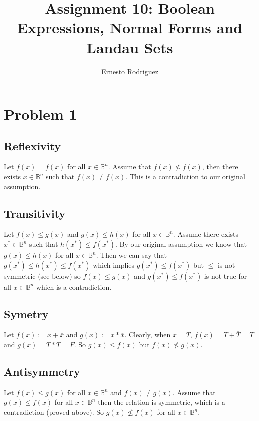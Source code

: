 \documentclass[11pt]{article}
\author{Ernesto Rodriguez}
\title{Assignment 10: Boolean Expressions, Normal Forms and Landau Sets}
\begin{document}
\maketitle

\section{Problem 1}

\subsection{Reflexivity}

Let $f(x)=f(x)$ for all $x \in \mathbb{B}^n$. Assume that $f(x) \nleq f(x)$, then there exists $x \in \mathbb{B}^n$ such that $f(x)\neq f(x)$. This is a contradiction to our original assumption.

\subsection{Transitivity}

Let $f(x)\leq g(x)$ and $g(x)\leq h(x)$ for all $x\in \mathbb{B}^n$. Assume there exists $x^*\in\mathbb{B}^n$ such that $h(x^*)\leq f(x^*)$. By our original assumption we know that $g(x)\leq h(x)$ for all $x\in\mathbb{B}^n$. Then we can say that $g(x^*)\leq h(x^*) \leq f(x^*)$ which implies $g(x^*)\leq f(x^*)$ but $\leq$ is not symmetric (see below) so $f(x)\leq g(x)$ and $g(x^*)\leq f(x^*)$ is not true for all $x\in\mathbb{B}^n$ which is a contradiction.

\subsection{Symetry}

Let $f(x):=x + \overline{x}$ and $g(x):=x * \overline{x}$. Clearly, when $x=T$, $f(x)=T + \overline{T}=T$ and $g(x)=T * \overline{T}=F$. So $g(x)\leq f(x)$ but $f(x)\nleq g(x)$.

\subsection{Antisymmetry}

Let $f(x)\leq g(x)$ for all $x\in\mathbb{B}^n$ and $f(x)\neq g(x)$. Assume that $g(x)\leq f(x)$ for all $x\in\mathbb{B}^n$ then the relation is symmetric, which is a contradiction (proved above). So $g(x)\nleq f(x)$ for all $x\in\mathbb{B}^n$.
\end{document}
